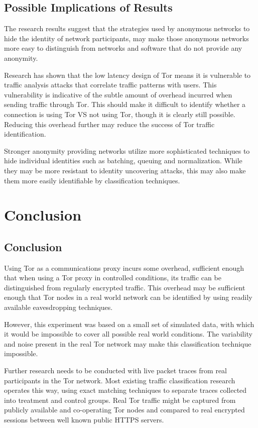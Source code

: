 \section{Possible Implications of Results}

The research results suggest that the strategies used by anonymous networks to
hide the identity of network participants, may make those anonymous networks
more easy to distinguish from networks and software that do not provide any
anonymity.

Research has shown that the low latency design of Tor means it is vulnerable to
traffic analysis attacks that correlate traffic patterns with users. This
vulnerability is indicative of the subtle amount of overhead incurred when
sending traffic through Tor. This should make it difficult to identify whether a
connection is using Tor VS not using Tor, though it is clearly still possible.
Reducing this overhead further may reduce the success of Tor traffic
identification.

Stronger anonymity providing networks utilize more sophisticated techniques to
hide individual identities such as batching, queuing and normalization. While
they may be more resistant to identity uncovering attacks, this may also make
them more easily identifiable by classification techniques.

\chapter{Conclusion}

\section{Conclusion}

Using Tor as a communications proxy incurs some overhead, sufficient enough
that when using a Tor proxy in controlled conditions, its traffic can be
distinguished from regularly encrypted traffic. This overhead may be sufficient
enough that Tor nodes in a real world network can be identified by using
readily available eavesdropping techniques.

However, this experiment was based on a small set of simulated data, with which
it would be impossible to cover all possible real world conditions. The
variability and noise present in the real Tor network may make this
classification technique impossible.

Further research needs to be conducted with live packet traces from real
participants in the Tor network. Most existing traffic classification research
operates this way, using exact matching techniques to separate traces collected
into treatment and control groups. Real Tor traffic might be captured from
publicly available and co-operating Tor nodes and compared to real encrypted
sessions between well known public HTTPS servers.
